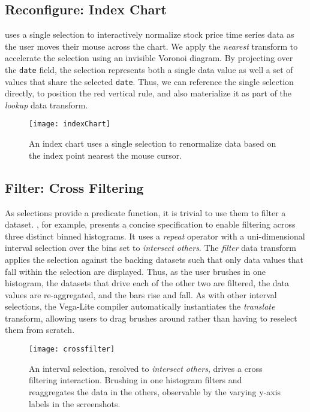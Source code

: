 \subsection{Reconfigure: Index Chart}

 uses a single selection to interactively normalize
stock price time series data as the user moves their mouse across the chart. We
apply the \emph{nearest} transform to accelerate the selection using an
invisible Voronoi diagram. By projecting over the \texttt{date} field, the
selection represents both a single data value as well a set of values that share
the selected \texttt{date}. Thus, we can reference the single selection
directly, to position the red vertical rule, and also materialize it as part of
the \emph{lookup} data transform.

\begin{figure}[h!]
  \centering
  \texttt{[image: indexChart]}
  \caption{An index chart uses a single selection to renormalize data based on
  the index point nearest the mouse cursor.}
  \label{fig:vl:indexChart}
\end{figure}

\subsection{Filter: Cross Filtering}

As selections provide a predicate function, it is trivial to use them to filter
a dataset. , for example, presents a concise
specification to enable filtering across three distinct binned histograms. It
uses a \emph{repeat} operator with a uni-dimensional interval selection over the
bins set to \emph{intersect others}. The \emph{filter} data transform applies
the selection against the backing datasets such that only data values that fall
within the selection are displayed. Thus, as the user brushes in one histogram,
the datasets that drive each of the other two are filtered, the data values are
re-aggregated, and the bars rise and fall. As with other interval selections,
the Vega-Lite compiler automatically instantiates the \emph{translate}
transform, allowing users to drag brushes around rather than having to reselect
them from scratch.

\begin{figure}[h!]
  \centering
  \texttt{[image: crossfilter]}
  \caption{An interval selection, resolved to \emph{intersect others}, drives a
  cross filtering interaction. Brushing in one histogram filters and
  reaggregates the data in the others, observable by the varying y-axis labels
  in the screenshots.}
  \label{fig:vl:crossfilter}
\end{figure}

